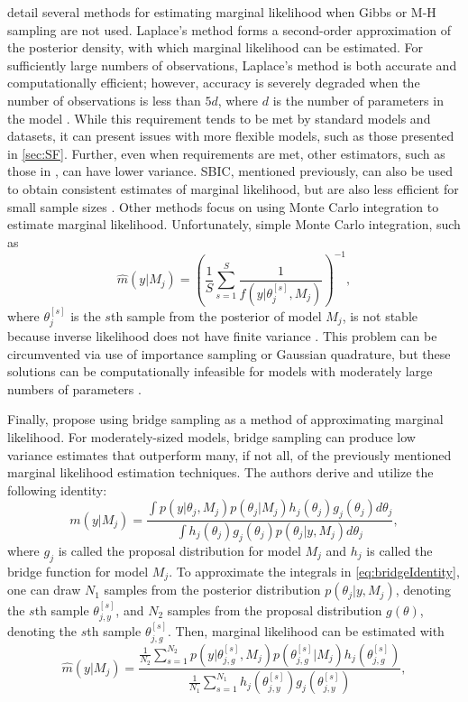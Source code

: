 \documentclass[twocolumn]{article}
\begin{document}
\cite{KassRaftery} detail several methods for estimating marginal likelihood when Gibbs or M-H sampling are not used. Laplace's method forms a second-order approximation of the posterior density, with which marginal likelihood can be estimated. For sufficiently large numbers of observations, Laplace's method is both accurate and computationally efficient; however, accuracy is severely degraded when the number of observations is less than $5d$, where $d$ is the number of parameters in the model \citep{Slate}. While this requirement tends to be met by standard models and datasets, it can present issues with more flexible models, such as those presented in \cref{sec:SF}. Further, even when requirements are met, other estimators, such as those in \cite{Chib}, can have lower variance. SBIC, mentioned previously, can also be used to obtain consistent estimates of marginal likelihood, but are also less efficient for small sample sizes \cite{Bollen}. Other methods focus on using Monte Carlo integration to estimate marginal likelihood. Unfortunately, simple Monte Carlo integration, such as
\begin{equation}
	\hat{m}(y|M_j) = \left(\frac{1}{S} \sum_{s=1}^S \frac{1}{f(y|\theta_j^{[s]}, M_j)}\right)^{-1},
\end{equation}
where $\theta_j^{[s]}$ is the $s$th sample from the posterior of model $M_j$, is not stable because inverse likelihood does not have finite variance \citep{NewtonRaferty}. This problem can be circumvented via use of importance sampling or Gaussian quadrature, but these solutions can be computationally infeasible for models with moderately large numbers of parameters \citep{GenzKass}.

Finally, \cite{MengWong} propose using bridge sampling as a method of approximating marginal likelihood. For moderately-sized models, bridge sampling can produce low variance estimates that outperform many, if not all, of the previously mentioned marginal likelihood estimation techniques. The authors derive and utilize the following identity:
\begin{equation}
	\label{eq:bridgeIdentity}
	m(y|M_j) = \frac{\int p(y|\theta_j, M_j)p(\theta_j|M_j)h_j(\theta_j)g_j(\theta_j) d\theta_j}{\int h_j(\theta_j)g_j(\theta_j)p(\theta_j|y, M_j) d\theta_j},
\end{equation}
where $g_j$ is called the proposal distribution for model $M_j$ and $h_j$ is called the bridge function for model $M_j$. To approximate the integrals in \cref{eq:bridgeIdentity}, one can draw $N_1$ samples from the posterior distribution $p(\theta_j|y, M_j)$, denoting the $s$th sample $\theta_{j,y}^{[s]}$, and $N_2$ samples from the proposal distribution $g(\theta)$, denoting the $s$th sample $\theta_{j,g}^{[s]}$. Then, marginal likelihood can be estimated with
\begin{equation}
	\label{eq:bridgeEstimate}
	\hat{m}(y|M_j) = \frac{\frac{1}{N_2}\sum_{s=1}^{N_2} p\left(y|\theta_{j,g}^{[s]}, M_j\right)p\left(\theta_{j,g}^{[s]}|M_j\right)h_j\left(\theta_{j,g}^{[s]}\right)}{\frac{1}{N_1}\sum_{s=1}^{N_1} h_j\left(\theta_{j,y}^{[s]}\right)g_j\left(\theta_{j,y}^{[s]}\right)},
\end{equation}
\end{document}
